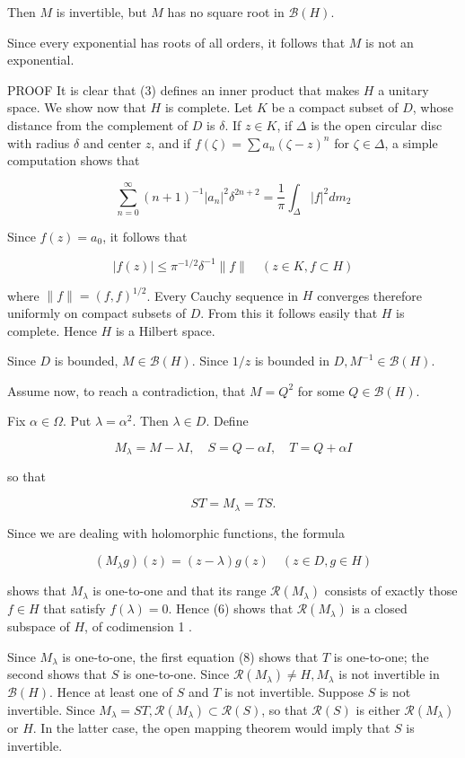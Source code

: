 \documentclass[10pt]{article}
\begin{document}
Then $M$ is invertible, but $M$ has no square root in $\mathscr{B}(H)$.

Since every exponential has roots of all orders, it follows that $M$ is not an exponential.

PROOF It is clear that (3) defines an inner product that makes $H$ a unitary space. We show now that $H$ is complete. Let $K$ be a compact subset of $D$, whose distance from the complement of $D$ is $\delta$. If $z \in K$, if $\Delta$ is the open circular disc with radius $\delta$ and center $z$, and if $f(\zeta)=\sum a_{n}(\zeta-z)^{n}$ for $\zeta \in \Delta$, a simple computation shows that

$$
\sum_{n=0}^{\infty}(n+1)^{-1}\left|a_{n}\right|^{2} \delta^{2 n+2}=\frac{1}{\pi} \int_{\Delta}|f|^{2} d m_{2}
$$

Since $f(z)=a_{0}$, it follows that

$$
|f(z)| \leq \pi^{-1 / 2} \delta^{-1}\|f\| \quad(z \in K, f \subset H)
$$

where $\|f\|=(f, f)^{1 / 2}$. Every Cauchy sequence in $H$ converges therefore uniformly on compact subsets of $D$. From this it follows easily that $H$ is complete. Hence $H$ is a Hilbert space.

Since $D$ is bounded, $M \in \mathscr{B}(H)$. Since $1 / z$ is bounded in $D, M^{-1} \in \mathscr{B}(H)$.

Assume now, to reach a contradiction, that $M=Q^{2}$ for some $Q \in \mathscr{B}(H)$.

Fix $\alpha \in \Omega$. Put $\lambda=\alpha^{2}$. Then $\lambda \in D$. Define

$$
M_{\lambda}=M-\lambda I, \quad S=Q-\alpha I, \quad T=Q+\alpha I
$$

so that

$$
S T=M_{\lambda}=T S .
$$

Since we are dealing with holomorphic functions, the formula

$$
\left(M_{\lambda} g\right)(z)=(z-\lambda) g(z) \quad(z \in D, g \in H)
$$

shows that $M_{\lambda}$ is one-to-one and that its range $\mathscr{R}\left(M_{\lambda}\right)$ consists of exactly those $f \in H$ that satisfy $f(\lambda)=0$. Hence (6) shows that $\mathscr{R}\left(M_{\lambda}\right)$ is a closed subspace of $H$, of codimension 1 .

Since $M_{\lambda}$ is one-to-one, the first equation (8) shows that $T$ is one-to-one; the second shows that $S$ is one-to-one. Since $\mathscr{R}\left(M_{\lambda}\right) \neq H, M_{\lambda}$ is not invertible in $\mathscr{B}(H)$. Hence at least one of $S$ and $T$ is not invertible. Suppose $S$ is not invertible. Since $M_{\lambda}=S T, \mathscr{R}\left(M_{\lambda}\right) \subset \mathscr{R}(S)$, so that $\mathscr{R}(S)$ is either $\mathscr{R}\left(M_{\lambda}\right)$ or $H$. In the latter case, the open mapping theorem would imply that $S$ is invertible.
\end{document}
